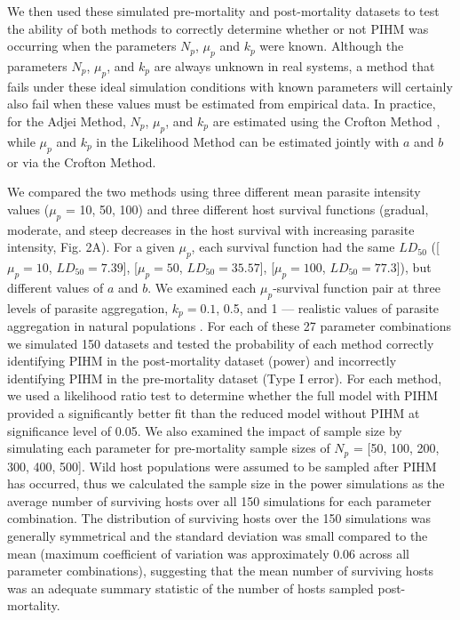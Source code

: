 \documentclass[12pt, a4paper]{article}
\begin{document}
We then used these simulated pre-mortality and post-mortality datasets to test the
ability of both methods to correctly determine whether or not PIHM was
occurring when the parameters $N_p$, $\mu_p$ and $k_p$ were known.  Although
the parameters $N_p$, $\mu_p$, and $k_p$ are always unknown in real systems, a
method that fails under these ideal simulation conditions with known parameters will certainly also fail when these values must be estimated from empirical data. In practice, for the Adjei Method, $N_p$, $\mu_p$,
and $k_p$ are estimated using the Crofton Method \citep{Adjei1986}, while $\mu_p$ and $k_p$ in
the Likelihood Method can be estimated jointly with $a$ and $b$ or via the
Crofton Method.

We compared the two methods using three different mean parasite intensity values ($\mu_p$ = 10, 50, 100) and three different host survival functions (gradual, moderate, and steep decreases in the host survival with increasing parasite intensity, Fig. 2A). For a given $\mu_p$, each survival function had the same $LD_{50}$ ([$\mu_p = 10$, $LD_{50} = 7.39$], [$\mu_p = 50$, $LD_{50} = 35.57$], [$\mu_p = 100$, $LD_{50}= 77.3$]),  but different values of $a$ and $b$.  We examined each $\mu_p$-survival function pair at  three levels of parasite
aggregation, $k_p = 0.1$, 0.5, and 1 --- realistic values of parasite aggregation in natural populations \citep{Shaw1998}.  For each of these 27 parameter
combinations we simulated 150 datasets and tested the probability of each method correctly identifying PIHM in the post-mortality dataset (power) and incorrectly identifying PIHM in the pre-mortality dataset (Type I error).  For each method, we used a likelihood ratio test to determine whether the full model with PIHM provided a significantly better fit than the reduced model without PIHM at significance level of 0.05.  We also examined the impact of sample size by simulating each parameter for pre-mortality sample sizes of $N_p$ = [50, 100, 200, 300, 400, 500].  Wild host populations were assumed to be sampled after PIHM has occurred, thus we calculated the sample size in the power simulations as the average number of surviving hosts over all 150 simulations for each parameter combination. The distribution of surviving hosts over the 150 simulations was generally symmetrical and the standard deviation was small compared to the mean (maximum coefficient of variation was approximately 0.06 across all parameter combinations), suggesting that the mean number of surviving hosts was an adequate summary statistic of the number of hosts sampled post-mortality.
\end{document}
